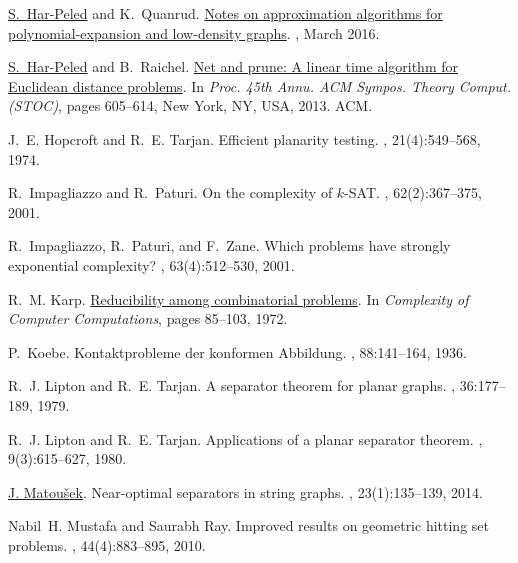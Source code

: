 \documentclass[12pt]{article}
\theoremstyle{remark}\theoremheaderfont{\sf}\theorembodyfont{\upshape}
\numberwithin{figure}{section}\numberwithin{table}{section}\numberwithin{equation}{section}
\begin{document}
{\begin{thebibliography}{vdSOdBV98}
\href{http://sarielhp.org}{S.~{{Har-Peled}}} and K.~{Quanrud}.
\newblock \href{http://arxiv.org/abs/1603.03098}{Notes on approximation
  algorithms for polynomial-expansion and low-density graphs}.
, March 2016.

\href{http://sarielhp.org}{S.~{{Har-Peled}}} and B.~Raichel.
\newblock \href{http://cs.uiuc.edu/~sariel/papers/12/aggregate/}{Net and prune:
  A linear time algorithm for {Euclidean} distance problems}.
\newblock In {\em Proc. 45th Annu. ACM Sympos. Theory Comput. {\em(STOC)}},
  pages 605--614, New York, NY, USA, 2013. ACM.

J.~E. Hopcroft and R.~E. Tarjan.
\newblock  Efficient planarity testing.
, 21(4):549--568, 1974.

R.~Impagliazzo and R.~Paturi.
\newblock  On the complexity of {$k$}-{SAT}.
, 62(2):367--375, 2001.

R.~Impagliazzo, R.~Paturi, and F.~Zane.
\newblock  Which problems have strongly exponential complexity?
, 63(4):512--530, 2001.

R.~M. Karp.
\newblock
  \href{http://www.cs.berkeley.edu/$\sim$luca/cs172/karp.pdf}{Reducibility
  among combinatorial problems}.
\newblock In {\em Complexity of Computer Computations}, pages 85--103, 1972.

P.~Koebe.
\newblock  Kontaktprobleme der konformen {Abbildung}.
, 88:141--164, 1936.

R.~J. Lipton and R.~E. Tarjan.
\newblock  A separator theorem for planar graphs.
, 36:177--189, 1979.

R.~J. Lipton and R.~E. Tarjan.
\newblock  Applications of a planar separator theorem.
, 9(3):615--627, 1980.

\href{http://kam.mff.cuni.cz/~matousek}{J. Matou{\v s}ek}.
\newblock  Near-optimal separators in string graphs.
, 23(1):135--139, 2014.

Nabil~H. Mustafa and Saurabh Ray.
\newblock  Improved results on geometric hitting set problems.
, 44(4):883--895, 2010.


\end{thebibliography}}
\end{document}
